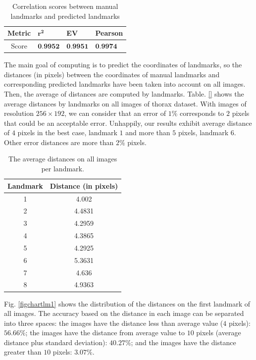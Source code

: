 \begin{table}[htbp]
	\centering
	\begin{tabular}{|c|p{2cm}|p{2cm}|p{2cm}|}
		Metric & $\mathbf{r^{2}}$ & \textbf{EV} & \textbf{Pearson} \\ \hline
		Score & $\textbf{0.9952}$ & $\textbf{0.9951}$ & $\textbf{0.9974}$ 
	\end{tabular}
	\caption{Correlation scores between manual landmarks and predicted landmarks}
	\label{tblcorrelation}
\end{table}

The main goal of computing is to predict the coordinates of landmarks, so the distances (in pixels) between the coordinates of manual landmarks and corresponding predicted landmarks have been taken into account on all images. Then, the average of distances are computed by landmarks. Table. \ref{} shows the average distances by landmarks on all images of thorax dataset. With images of resolution $256 \times 192$, we can
consider that an error of $1\%$ corresponds to $2$ pixels that could
be an acceptable error. Unhappily, our results exhibit average
distance of $4$ pixels in the best case, landmark $1$ and more than
$5$ pixels, landmark $6$. Other error distances are more than $2\%$
pixels.

\begin{table}[htbp]
	\centering
	\begin{tabular}{|c|c|}
		\hline
		\textbf{Landmark} & \textbf{Distance} (in pixels) \\ \hline
		1 & 4.002  \\ \hline
		2 & 4.4831 \\ \hline
		3 & 4.2959 \\ \hline
		4 & 4.3865 \\ \hline
		5 & 4.2925 \\ \hline
		6 & 5.3631 \\ \hline
		7 & 4.636 \\ \hline
		8 & 4.9363 \\ \hline
	\end{tabular}
	\caption{The average distances on all images per landmark.}
\end{table}

Fig. \ref{figchartlm1} shows the distribution of the distances on the first landmark of all images. The accuracy based on the distance in each image can be
separated into three spaces: the images have the distance less
than average value ($4$ pixels): $56.66\%$; the images have the
distance from average value to $10$ pixels (average distance plus
standard deviation): $40.27\%$; and the images have the distance
greater than $10$ pixels: $3.07\%$.

